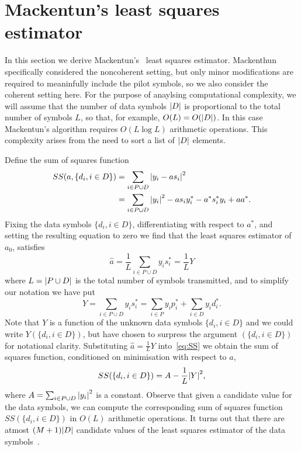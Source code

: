 \documentclass[a4paper,10pt]{article}
\begin{document}
\section{Mackentun's least squares estimator}\label{sec:least-squar-estim}

In this section we derive Mackentun's~\cite{Mackenthun1994} least squares estimator.  Mackenthun specifically considered the noncoherent setting, but only minor modifications are required to meaninfully include the pilot symbols, so we also consider the coherent setting here.  For the purpose of anaylsing computational complexity, we will assume that the number of data symbols ${\left| D \right|}$ is proportional to the total number of symbols $L$, so that, for example, $O(L) = O({\left| D \right|})$.  In this case Mackentun's algorithm requires $O(L \log L)$ arithmetic operations.  This complexity arises from the need to sort a list of ${\left| D \right|}$ elements.  %

Define the sum of squares function
\begin{align}
SS(a, \{d_i, i \in D\}) &= \sum_{i \in P \cup D} {\left|  y_i - a s_i  \right|}^2 \nonumber \\
&= \sum_{i \in P \cup D} {\left| y_i \right|}^2 - a s_i y_i^* - a^* s_i^* y_i + aa^*. \label{eq:SS}
\end{align}
Fixing the data symbols $\{d_i, i \in D\}$, differentiating with respect to $a^*$, and setting the resulting equation to zero we find that the least squares estimator of $a_0$, satisfies
\begin{equation}\label{eq:hata}
\hat{a} = \frac{1}{L} \sum_{i \in P \cup D} y_i s_i^* = \frac{1}{L} Y
\end{equation}
where $L = {\left| P \cup D \right|}$ is the total number of symbols transmitted, and to simplify our notation we have put 
\[
Y = \sum_{i \in P \cup D} y_i s_i^* = \sum_{i \in P } y_i p_i^* + \sum_{i \in D } y_i d_i^*.
\]  
Note that $Y$ is a function of the unknown data symbols $\{ d_i, i \in D\}$ and we could write $Y(\{ d_i, i \in D\})$, but have chosen to surpress the argument $(\{ d_i, i \in D\})$ for notational clarity.  Substituting $\hat{a} = \frac{1}{L}Y$ into~\eqref{eq:SS} we obtain the sum of squares function, conditioned on minimisation with respect to $a$,
\begin{equation}\label{eq:SSdatasymbols}
SS(\{d_i, i \in D\}) = A - \frac{1}{L}{\left| Y \right|}^2,
\end{equation}
where $A = \sum_{i \in P \cup D}{\left| y_i \right|}^2$ is a constant.  Observe that given a candidate value for the data symbols, we can compute the corresponding sum of squares function $SS(\{d_i, i \in D\})$ in $O(L)$ arithmetic operations.  It turns out that there are atmost $(M+1){\left| D \right|}$ candidate values of the least squares estimator of the data symbols~\cite{Sweldens2001,Mackenthun1994}.  %
\end{document}
